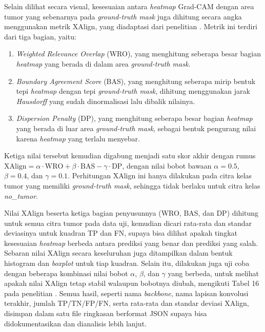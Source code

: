 Selain dilihat secara visual, kesesuaian antara \textit{heatmap} Grad-CAM dengan area tumor yang sebenarnya pada \textit{ground-truth mask} juga dihitung secara angka menggunakan metrik XAlign, yang diadaptasi dari penelitian \textcite{muhammad2025heatmap}. Metrik ini terdiri dari tiga bagian, yaitu:
\begin{enumerate}
	\item \textit{Weighted Relevance Overlap} (WRO), yang menghitung seberapa besar bagian \textit{heatmap} yang berada di dalam area \textit{ground-truth mask}.
	\item \textit{Boundary Agreement Score} (BAS), yang menghitung seberapa mirip bentuk tepi \textit{heatmap} dengan tepi \textit{ground-truth mask}, dihitung menggunakan jarak \textit{Hausdorff} yang sudah dinormalisasi lalu dibalik nilainya.
	\item \textit{Dispersion Penalty} (DP), yang menghitung seberapa besar bagian \textit{heatmap} yang berada di luar area \textit{ground-truth mask}, sebagai bentuk pengurang nilai karena \textit{heatmap} yang terlalu menyebar.
\end{enumerate}
Ketiga nilai tersebut kemudian digabung menjadi satu skor akhir dengan rumus $\text{XAlign} = \alpha \cdot \text{WRO} + \beta \cdot \text{BAS} - \gamma \cdot \text{DP}$, dengan nilai bobot bawaan $\alpha = 0.5$, $\beta = 0.4$, dan $\gamma = 0.1$. Perhitungan XAlign ini hanya dilakukan pada citra kelas tumor yang memiliki \textit{ground-truth mask}, sehingga tidak berlaku untuk citra kelas \textit{no\_tumor}.

Nilai XAlign beserta ketiga bagian penyusunnya (WRO, BAS, dan DP) dihitung untuk semua citra tumor pada data uji, kemudian dicari rata-rata dan standar deviasinya untuk kuadran TP dan FN, supaya bisa dilihat apakah tingkat kesesuaian \textit{heatmap} berbeda antara prediksi yang benar dan prediksi yang salah. Sebaran nilai XAlign secara keseluruhan juga ditampilkan dalam bentuk histogram dan \textit{boxplot} untuk tiap kuadran. Selain itu, dilakukan juga uji coba dengan beberapa kombinasi nilai bobot $\alpha$, $\beta$, dan $\gamma$ yang berbeda, untuk melihat apakah nilai XAlign tetap stabil walaupun bobotnya diubah, mengikuti Tabel 16 pada penelitian \textcite{muhammad2025heatmap}. Semua hasil, seperti nama \textit{backbone}, nama lapisan konvolusi terakhir, jumlah TP/TN/FP/FN, serta rata-rata dan standar deviasi XAlign, disimpan dalam satu file ringkasan berformat JSON supaya bisa didokumentasikan dan dianalisis lebih lanjut.